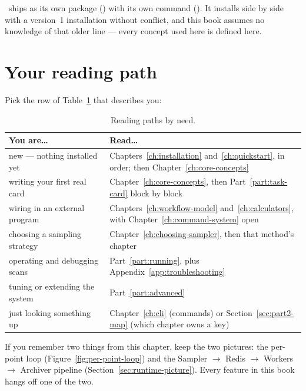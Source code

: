 \Jtwo\ ships as its own package () with its own command
(). It installs side by side with a version~1 installation without
conflict, and this book assumes no knowledge of that older line --- every concept used
here is defined here.

\section{Your reading path}
\label{sec:next}

Pick the row of Table~\ref{tab:reading-paths} that describes you:

\begin{table}[ht]
  \footnotesize
  \begingroup
  \setlength{\tabcolsep}{0pt}
  \begin{tabular}{@{}p{0.34\linewidth}p{0.66\linewidth}@{}}
    \toprule
    \textbf{You are\ldots} & \textbf{Read\ldots} \\
    \midrule
    new --- nothing installed yet & Chapters~\ref{ch:installation}
      and~\ref{ch:quickstart}, in order; then Chapter~\ref{ch:core-concepts} \\
    writing your first real card & Chapter~\ref{ch:core-concepts}, then
      Part~\ref{part:task-card} block by block \\
    wiring in an external program & Chapters~\ref{ch:workflow-model} and~\ref{ch:calculators},
      with Chapter~\ref{ch:command-system} open \\
    choosing a sampling strategy & Chapter~\ref{ch:choosing-sampler}, then that
      method's chapter \\
    operating and debugging scans & Part~\ref{part:running}, plus
      Appendix~\ref{app:troubleshooting} \\
    tuning or extending the system & Part~\ref{part:advanced} \\
    just looking something up & Chapter~\ref{ch:cli} (commands) or
      Section~\ref{sec:part2-map} (which chapter owns a key) \\
    \bottomrule
  \end{tabular}
  \endgroup
  \caption{Reading paths by need.}
  \label{tab:reading-paths}
\end{table}

\begin{jtip}
If you remember two things from this chapter, keep the two pictures: the per-point
loop (Figure~\ref{fig:per-point-loop}) and the Sampler $\rightarrow$ Redis
$\rightarrow$ Workers $\rightarrow$ Archiver pipeline
(Section~\ref{sec:runtime-picture}). Every feature in this book hangs off one of the
two.
\end{jtip}
